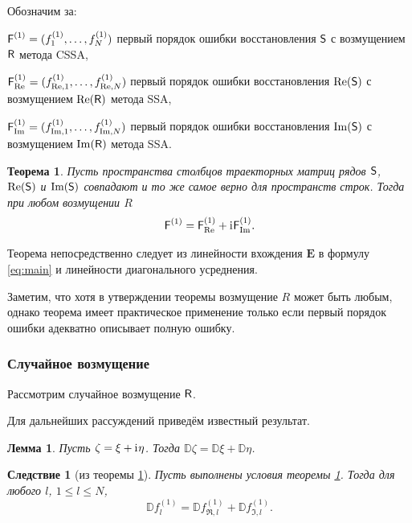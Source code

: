 \documentclass{spisok-article}
\newtheorem{corollary}{Следствие}%
\newtheorem{theorem}{Теорема}%
\newtheorem{lemma}{Лемма}%
\begin{document}
Обозначим за:

$\textsf{F}^{(1)} = (f^{(1)}_1, \ldots, f^{(1)}_N)$ первый порядок ошибки восстановления $\textsf{S}$ с возмущением $\textsf{R}$ метода CSSA,

$\textsf{F}^{(1)}_{\Re} = (f^{(1)}_{\Re,1}, \ldots, f^{(1)}_{\Re, N})$ первый порядок ошибки восстановления $\Re(\textsf{S})$ с возмущением $\Re(\textsf{R})$ метода SSA,

$\textsf{F}^{(1)}_{\Im} = (f^{(1)}_{\Im,1}, \ldots, f^{(1)}_{\Im, N})$ первый порядок ошибки восстановления $\Im(\textsf{S})$ с возмущением $\Im(\textsf{R})$ метода SSA.


\begin{theorem}\label{th:sum}
Пусть пространства столбцов траекторных матриц рядов $\textsf{S}$, $\Re(\textsf{S})$ и $\Im(\textsf{S})$ совпадают и то же самое верно для пространств строк.
Тогда при любом возмущении $R$ $$\textsf{F}^{(1)} = \textsf{F}^{(1)}_{\Re} + \mathrm{i}\mkern1mu\textsf{F}^{(1)}_{\Im}.$$
\end{theorem}

Теорема непосредственно следует из линейности вхождения $\mathbf{E}$ в формулу \eqref{eq:main} и линейности диагонального усреднения.

Заметим, что хотя в утверждении теоремы возмущение $R$ может быть любым, однако теорема имеет практическое применение только если первый порядок ошибки адекватно описывает полную ошибку.

\subsubsection{Случайное возмущение}

Рассмотрим случайное возмущение $\textsf{R}$.

Для дальнейших рассуждений приведём известный результат.
\begin{lemma} \label{std:disp}
Пусть $\zeta = \xi + \mathrm{i}\mkern1mu\eta$. Тогда $\mathbb{D}\zeta = \mathbb{D}\xi + \mathbb{D}\eta$.
\end{lemma}

\begin{corollary}[из теоремы {\ref{th:sum}}] \label{st:dispsum}
	Пусть выполнены условия теоремы \ref{th:sum}.
	Тогда для любого $l$, $1\le l \le N$,
	\begin{equation} \label{eq:dispsum}
		\mathbb{D}f^{(1)}_l = \mathbb{D}f^{(1)}_{\Re, l} + \mathbb{D}f^{(1)}_{\Im, l}.	
	\end{equation}
\end{corollary}
\end{document}
